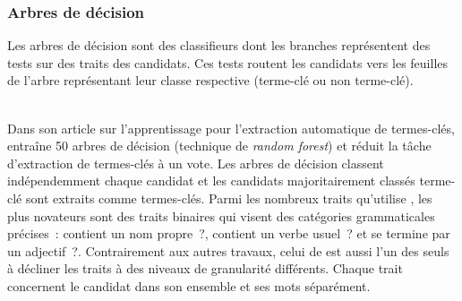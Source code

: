       \subsubsection{Arbres de décision}
      \label{subsubsec:main-state_of_the_art-automatic_keyphrase_extraction-supervised_keyphrase_extraction-decision_trees}
        Les arbres de décision sont des classifieurs dont les branches
        représentent des tests sur des traits des candidats. Ces tests routent
        les candidats vers les feuilles de l'arbre représentant leur classe
        respective (\og{}terme-clé\fg{} ou \og{}non terme-clé\fg{}).

        ~\\Dans son article sur l'apprentissage pour l'extraction automatique de
        termes-clés,  entraîne 50 arbres
        de décision (technique de \textit{random forest}) et réduit la tâche
        d'extraction de termes-clés à un vote. Les arbres de décision classent
        indépendemment chaque candidat et les candidats majoritairement
        classés \og{}terme-clé\fg{} sont extraits comme termes-clés. Parmi les
        nombreux traits qu'utilise , les
        plus novateurs sont des traits binaires qui visent des catégories
        grammaticales précises~: \og{}contient un nom propre~?\fg{},
        \og{}contient un verbe usuel~?\fg{} et \og{}se termine par un
        adjectif~?\fg{}. Contrairement aux autres travaux, celui de
         est aussi l'un des seuls à
        décliner les traits à des niveaux de granularité différents. Chaque
        trait concernent le candidat dans son ensemble et ses mots séparément.

